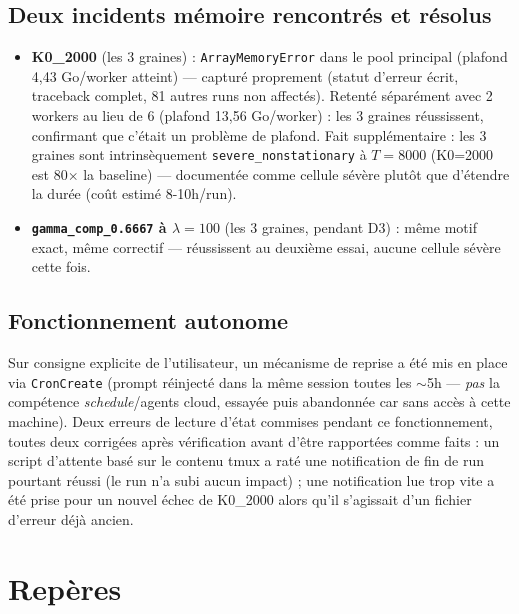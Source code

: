 \documentclass[11pt,a4paper]{article}
\newcommand{\code}[1]{\texttt{#1}}
\begin{document}
\subsection{Deux incidents mémoire rencontrés et résolus}
\label{sec:incidents}

\begin{itemize}
\item \textbf{K0\_2000} (les 3 graines) : \code{ArrayMemoryError} dans le
  pool principal (plafond 4,43 Go/worker atteint) --- capturé proprement
  (statut d'erreur écrit, traceback complet, 81 autres runs non
  affectés). Retenté séparément avec 2 workers au lieu de 6 (plafond
  13,56 Go/worker) : les 3 graines réussissent, confirmant que c'était un
  problème de plafond. Fait supplémentaire : les 3 graines sont
  intrinsèquement \code{severe\_nonstationary} à $T=8000$ (K0=2000 est
  80$\times$ la baseline) --- documentée comme cellule sévère plutôt que
  d'étendre la durée (coût estimé 8-10h/run).
\item \textbf{\code{gamma\_comp\_0.6667} à $\lambda=100$} (les 3 graines,
  pendant D3) : même motif exact, même correctif --- réussissent au
  deuxième essai, aucune cellule sévère cette fois.
\end{itemize}

\subsection{Fonctionnement autonome}

Sur consigne explicite de l'utilisateur, un mécanisme de reprise a été
mis en place via \code{CronCreate} (prompt réinjecté dans la même session
toutes les $\sim$5h --- \emph{pas} la compétence \emph{schedule}/agents
cloud, essayée puis abandonnée car sans accès à cette machine). Deux
erreurs de lecture d'état commises pendant ce fonctionnement, toutes deux
corrigées après vérification avant d'être rapportées comme faits : un
script d'attente basé sur le contenu tmux a raté une notification de fin
de run pourtant réussi (le run n'a subi aucun impact) ; une notification
lue trop vite a été prise pour un nouvel échec de K0\_2000 alors qu'il
s'agissait d'un fichier d'erreur déjà ancien.

\section{Repères}
\end{document}
